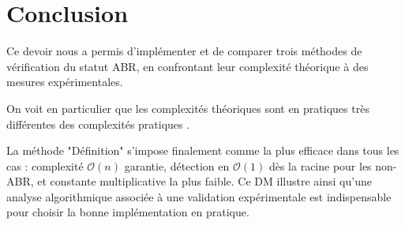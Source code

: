 \documentclass[12pt, a4paper]{article}
\begin{document}
\section*{Conclusion}

Ce devoir nous a permis d'implémenter et de comparer trois méthodes de vérification
du statut ABR, en confrontant leur complexité théorique à des mesures expérimentales.

On voit en particulier que les complexités théoriques sont en pratiques très différentes 
des complexités pratiques .

La méthode "Définition" s'impose finalement comme la plus efficace dans tous les cas :
complexité $\mathcal{O}(n)$ garantie, détection en $\mathcal{O}(1)$ dès la racine
pour les non-ABR, et constante multiplicative la plus faible. Ce DM illustre ainsi
qu'une analyse algorithmique associée à une validation expérimentale
est indispensable pour choisir la bonne implémentation en pratique.
\end{document}
